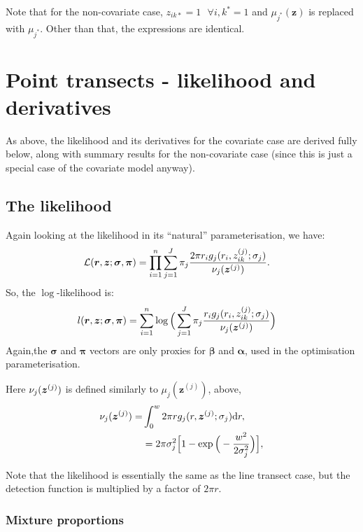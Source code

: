 Note that for the non-covariate case, $z_{ik*}=1 \text{ } \forall i, k^*=1$ and $\mu_{j^*}(\bm{z})$ is replaced with $\mu_{j^*}$. Other than that, the expressions are identical.


\section{Point transects - likelihood and derivatives}

As above, the likelihood and its derivatives for the covariate case are derived fully below, along with summary results for the non-covariate case (since this is just a special case of the covariate model anyway).

\subsection{The likelihood}

Again looking at the likelihood in its ``natural'' parameterisation, we have:
\begin{align*}
\mathcal{L}(\bm{r}, \bm{z} ;\bm{\sigma},\bm{\pi}) &= \prod_{i=1}^n \sum_{j=1}^J \pi_j \frac{2 \pi r_i g_j(r_i, z_{ik}^{(j)};\sigma_j)}{\nu_j(\bm{z}^{(j)})}.
\end{align*}
So, the $\log$-likelihood is:
\begin{align*}
l(\bm{r}, \bm{z};\bm{\sigma},\bm{\pi}) &= \sum_{i=1}^n \log\Big(\sum_{j=1}^J \pi_j \frac{r_i g_j(r_i,z_{ik}^{(j)};\sigma_j)}{\nu_j(\bm{z}^{(j)})}\Big)
\end{align*}
Again,the $\bm{\sigma}$ and $\bm{\pi}$ vectors are only proxies for $\bm{\beta}$ and $\bm{\alpha}$, used in the optimisation parameterisation.

Here $\nu_j(\bm{z}^{(j)})$ is defined similarly to $\mu_j(\bm{z}^{(j)})$, above,
\begin{align*}
\nu_j(\bm{z}^{(j)})=& \int_0^w 2 \pi r g_j(r,\bm{z}^{(j)};\sigma_j) \text{d}r,\\
&= 2 \pi \sigma_j^2 \Big[1-\exp\Big( -\frac{w^2}{2\sigma_j^2}\Big)\Big],
\end{align*}

Note that the likelihood is essentially the same as the line transect case, but the detection function is multiplied by a factor of $2 \pi r$.


\subsubsection{Mixture proportions}

